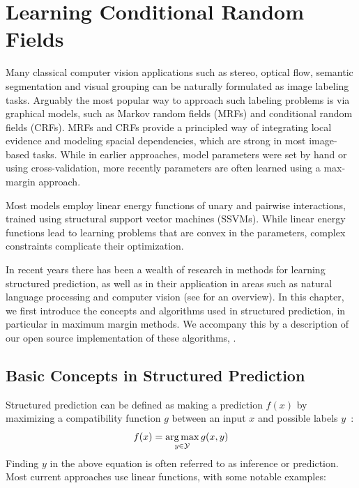 \chapter{Learning Conditional Random Fields}\label{ch:structured_pystruct}

Many classical computer vision applications such as stereo, optical flow, semantic
segmentation and visual grouping can be naturally formulated as image labeling tasks.
%
Arguably the most popular way to approach such labeling problems is via graphical
models, such as Markov random fields (MRFs) and conditional random fields (CRFs).
MRFs and CRFs provide a principled way of integrating local evidence and
modeling spacial dependencies, which are strong in most image-based tasks.
%
While in earlier approaches, model parameters were set by hand or using
cross-validation, more recently parameters are often learned using a max-margin
approach.

Most models employ linear energy functions of unary and pairwise interactions,
trained using structural support vector machines (SSVMs). While linear energy
functions lead to learning problems that are convex in the parameters, complex
constraints complicate their optimization.  %

In recent years there has been a wealth of research in methods for learning
structured prediction, as well as in their application in areas such as natural
language processing and computer vision (see \citet{nowozin2011structured} %
for an overview).
%
In this chapter, we first introduce the concepts and algorithms used in
structured prediction, in particular in maximum margin methods. We 
accompany this by a description of our open source implementation of these
algorithms, \pystruct.

\section{Basic Concepts in Structured Prediction}

Structured prediction can be defined as making a prediction $f(x)$ by maximizing a
compatibility function $g$ between an input $x$ and possible labels
$y$~\citep{nowozin2011structured}:
\begin{equation}
    f(x) = \operatorname*{arg\,max}_{y \in \mathcal{Y}} g(x, y)
\end{equation}
Finding $y$ in the above equation is often referred to as inference
or prediction.
Most current approaches use linear functions,
with some notable examples: %

